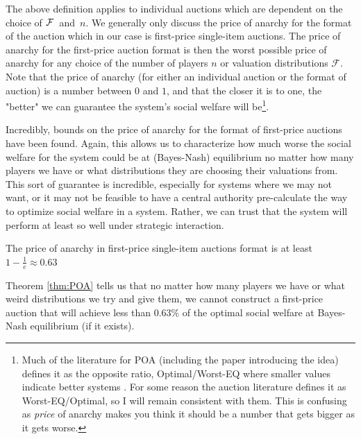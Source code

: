 \documentclass[12pt,twoside]{reedthesis}
\begin{document}
The above definition applies to individual auctions which are dependent on the choice  of $\mathcal{F}$~and~$n$. We generally only discuss the price of anarchy for the format of the auction which in our case is first-price single-item auctions.  The price of anarchy for the first-price auction format is then the worst possible price of anarchy for any choice of the number of players $n$ or valuation distributions $\mathcal{F}$. Note that the price of anarchy (for either an individual auction or the format of auction) is a number between $0$ and $1$, and that the closer it is to one, the "better" we can guarantee the system's social welfare will be\footnote{Much of the literature for POA (including the paper introducing the idea) defines it as the opposite ratio, Optimal/Worst-EQ where smaller values indicate better systems \citep{Koutsoupias1999}. For some reason the auction literature defines it as Worst-EQ/Optimal, so I will remain consistent with them. This is confusing as {\em price} of anarchy makes you think it should be a number that gets bigger as it gets worse.}.

Incredibly, bounds on the price of anarchy for the format of first-price auctions have been found. Again, this allows us to characterize how much worse the social welfare for the system could be at (Bayes-Nash) equilibrium no matter how many players we have or what distributions they are choosing their valuations from. This sort of guarantee is incredible, especially for systems where we may not want, or it may not be feasible to have a central authority pre-calculate the way to optimize social welfare in a system. Rather, we can trust that the system will perform at least so well under strategic interaction.

\begin{theorem}{\citep{Syrgkanis2013}}
	The price of anarchy in first-price single-item auctions format is at least $1-\frac{1}{e} \approx 0.63$
	\label{thm:POA}	
\end{theorem}

%

Theorem \ref{thm:POA} tells us that no matter  how many players we have or what weird distributions we try and give them, we cannot construct a first-price auction that will achieve less than $0.63$\% of the optimal social welfare at Bayes-Nash equilibrium (if it exists). 
 
\end{document}
